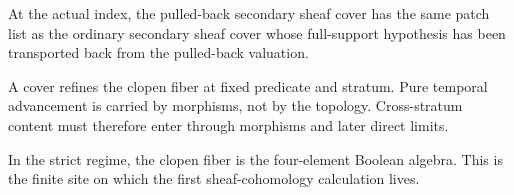 \begin{theorem}\label{thm:claim-secondary-pullback-sheaf-patches-actual}\leanok{}
At the actual index, the pulled-back secondary sheaf cover has the same patch
list as the ordinary secondary sheaf cover whose full-support hypothesis has
been transported back from the pulled-back valuation.
\end{theorem}

\begin{theorem}\label{thm:no-temporal-covers}\leanok{}
A cover refines the clopen fiber at fixed predicate and stratum.  Pure temporal
advancement is carried by morphisms, not by the topology.  Cross-stratum
content must therefore enter through morphisms and later direct limits.
\end{theorem}

\begin{theorem}\label{thm:strict-site-finite-fiber}\leanok{}
In the strict regime, the clopen fiber is the four-element Boolean algebra.
This is the finite site on which the first sheaf-cohomology calculation lives.
\end{theorem}
